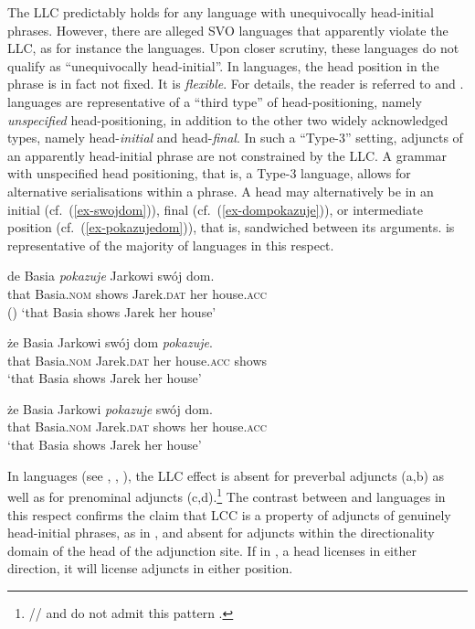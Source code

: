\documentclass[output=paper
  ,nobabel
  ,uniformtopskip %
]{langscibook}
\begin{document}
\largerpage
\noindent
The LLC predictably holds for any language with unequivocally head-initial phrases. However, there are alleged SVO languages that apparently violate the LLC, as for instance the  languages. Upon closer scrutiny, these languages do not qualify as ``unequivocally head-initial''. In  languages, the head position in the phrase is in fact not fixed. It is \emph{flexible}. For details, the reader is referred to \citet{HaiderSzucsich2022a} and \citet{SzucsichHaider2015}.
 languages are representative of a ``third type'' of head-positioning, namely \emph{unspecified} head-positioning, in addition to the other two widely acknowledged types, namely
head-\emph{initial} and head-\emph{final}. In such a ``Type-3'' setting, adjuncts of an apparently head-initial phrase are not constrained by the LLC. A grammar with unspecified head positioning, that is, a Type-3 language, allows for alternative serialisations within a phrase. A head may alternatively be in an initial (cf.\ (\ref{ex-swojdom})), final (cf.\ (\ref{ex-dompokazuje})), or intermediate position (cf.\ (\ref{ex-pokazujedom})), that is, sandwiched between its arguments.  is representative of the majority of  languages in this respect.


\eal\label{ex-slavic}
\ex\label{ex-swojdom}
\gll de Basia \emph{pokazuje} Jarkowi swój dom. \\
that Basia\textsc{.nom} shows Jarek\textsc{.dat} her house\textsc{.acc} \\\hfill()
\glt `that Basia shows Jarek her house'

\ex\label{ex-dompokazuje}
\gll że Basia Jarkowi swój dom \emph{pokazuje}. \\
that Basia\textsc{.nom} Jarek\textsc{.dat} her house\textsc{.acc} shows \\
\glt `that Basia shows Jarek her house'


\ex\label{ex-pokazujedom}
\gll że Basia Jarkowi \emph{pokazuje} swój dom. \\
that Basia\textsc{.nom} Jarek\textsc{.dat} shows her house\textsc{.acc} \\
\glt `that Basia shows Jarek her house'

\zl

\largerpage
\noindent
In  languages (see \citealt[116]{SiewierskaUhlirova1998a}, \citealt[16]{HaiderSzucsich2022a},
\citealt[Section~6]{HaiderSzucsich2022b}), the LLC effect is absent for preverbal adjuncts
(a,b) as well as for prenominal adjuncts (c,d).\footnote{%
// and  do not admit this pattern \citep[116]{SiewierskaUhlirova1998a}.
} The contrast between  and 
languages in this respect confirms the claim that LCC is a property of adjuncts of genuinely
head-initial phrases, as in , and absent for adjuncts within the directionality domain of the
head of the adjunction site. If in , a head licenses in either direction, it will license
adjuncts in either position.
\end{document}
